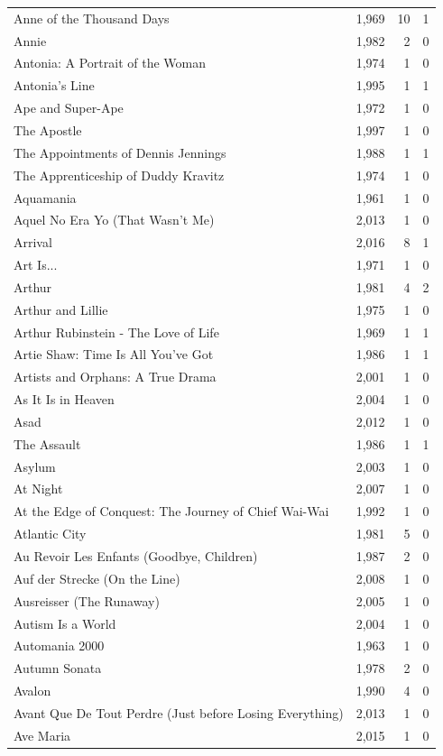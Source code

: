 \begin{tabular}{lrrr}
Anne of the Thousand Days & 1,969 & 10 & 1 \\
Annie & 1,982 & 2 & 0 \\
Antonia: A Portrait of the Woman & 1,974 & 1 & 0 \\
Antonia's Line & 1,995 & 1 & 1 \\
Ape and Super-Ape & 1,972 & 1 & 0 \\
The Apostle & 1,997 & 1 & 0 \\
The Appointments of Dennis Jennings & 1,988 & 1 & 1 \\
The Apprenticeship of Duddy Kravitz & 1,974 & 1 & 0 \\
Aquamania & 1,961 & 1 & 0 \\
Aquel No Era Yo (That Wasn't Me) & 2,013 & 1 & 0 \\
Arrival & 2,016 & 8 & 1 \\
Art Is... & 1,971 & 1 & 0 \\
Arthur & 1,981 & 4 & 2 \\
Arthur and Lillie & 1,975 & 1 & 0 \\
Arthur Rubinstein - The Love of Life & 1,969 & 1 & 1 \\
Artie Shaw: Time Is All You've Got & 1,986 & 1 & 1 \\
Artists and Orphans: A True Drama & 2,001 & 1 & 0 \\
As It Is in Heaven & 2,004 & 1 & 0 \\
Asad & 2,012 & 1 & 0 \\
The Assault & 1,986 & 1 & 1 \\
Asylum & 2,003 & 1 & 0 \\
At Night & 2,007 & 1 & 0 \\
At the Edge of Conquest: The Journey of Chief Wai-Wai & 1,992 & 1 & 0 \\
Atlantic City & 1,981 & 5 & 0 \\
Au Revoir Les Enfants (Goodbye, Children) & 1,987 & 2 & 0 \\
Auf der Strecke (On the Line) & 2,008 & 1 & 0 \\
Ausreisser (The Runaway) & 2,005 & 1 & 0 \\
Autism Is a World & 2,004 & 1 & 0 \\
Automania 2000 & 1,963 & 1 & 0 \\
Autumn Sonata & 1,978 & 2 & 0 \\
Avalon & 1,990 & 4 & 0 \\
Avant Que De Tout Perdre (Just before Losing Everything) & 2,013 & 1 & 0 \\
Ave Maria & 2,015 & 1 & 0 \\

\end{tabular}
